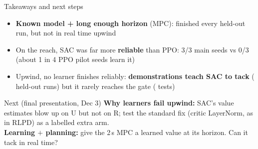 \documentclass[aspectratio=169,11pt]{beamer}
\newcommand{\PPO}{\textcolor{colPPO}{PPO}}
\newcommand{\SAC}{\textcolor{colSAC}{SAC}}
\newcommand{\MPC}{\textcolor{colMPC}{MPC}}
\begin{document}
\begin{frame}{Takeaways and next steps}
  \begin{itemize}
    \item \textbf{Known model + long enough horizon} (\MPC): finished every held-out run, but not in real time upwind
    \item On the reach, \SAC{} was far more \textbf{reliable} than \PPO: 3/3 main seeds vs 0/3 (about 1 in 4 \PPO{} pilot seeds learn it)
    \item Upwind, no learner finishes reliably: \textbf{demonstrations teach \SAC{} to tack}
          (\uSACDtacked{} held-out runs) but it rarely reaches the gate (\uSACDtest{} tests)
  \end{itemize}
  \vspace{1em}
  \begin{block}{Next (final presentation, Dec 3)}
    \textbf{Why learners fail upwind:} \SAC{}'s value estimates blow up on U but not on R;
    test the standard fix (critic LayerNorm, as in RLPD) as a labelled extra arm.\\[0.3em]
    \textbf{Learning $+$ planning:} give the 2\,s \MPC{} a learned value at its horizon.
    Can it tack in real time?
  \end{block}
\end{frame}
\end{document}
